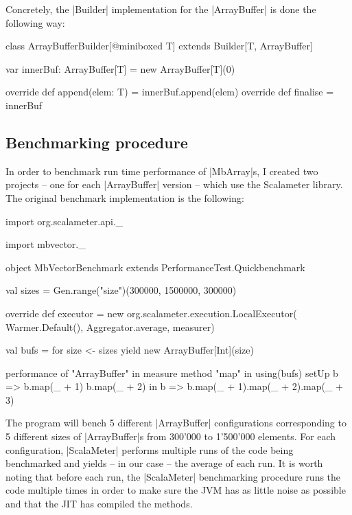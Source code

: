 Concretely, the |Builder| implementation for the |ArrayBuffer| is done the following way:

\begin{lstlisting-nobreak}
class ArrayBufferBuilder[@miniboxed T] extends Builder[T, ArrayBuffer] {

  var innerBuf: ArrayBuffer[T] = new ArrayBuffer[T](0)

  override def append(elem: T) = innerBuf.append(elem)
  override def finalise = innerBuf
}
\end{lstlisting-nobreak}

\subsection{Benchmarking procedure}

In order to benchmark run time performance of |MbArray|s, I created two projects -- one for each |ArrayBuffer| version -- which use the Scalameter library. The original benchmark implementation is the following:

\begin{lstlisting-nobreak}
import org.scalameter.api._

import mbvector._

object MbVectorBenchmark extends PerformanceTest.Quickbenchmark {
  val sizes = Gen.range("size")(300000, 1500000, 300000)

  override def executor = new org.scalameter.execution.LocalExecutor(
    Warmer.Default(),
    Aggregator.average,
    measurer)

  val bufs = for {
    size <- sizes
  } yield new ArrayBuffer[Int](size)

  performance of "ArrayBuffer" in {
    measure method "map" in {
      using(bufs) setUp {
        b => 
          b.map(_ + 1)
          b.map(_ + 2)
      } in {
        b => b.map(_ + 1).map(_ + 2).map(_ + 3)
      }
    }
  }
}
\end{lstlisting-nobreak}

The program will bench 5 different |ArrayBuffer| configurations corresponding to 5 different sizes of |ArrayBuffer|s from 300'000 to 1'500'000 elements. For each configuration, |ScalaMeter| performs multiple runs of the code being benchmarked and yields -- in our case -- the average of each run. It is worth noting that before each run, the |ScalaMeter| benchmarking procedure runs the code multiple times in order to make sure the JVM has as little noise as possible and that the JIT has compiled the methods.

